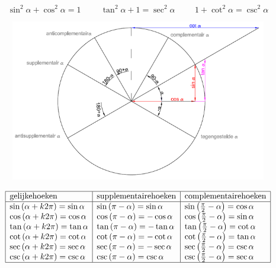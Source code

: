 \documentclass[a5paper]{article}
\begin{document}
\[
\boxed{\sin^2{\alpha} + \cos^2{\alpha} = 1} \hspace{1cm}
\boxed{\tan^2{\alpha} + 1 = \sec^2{\alpha}} \hspace{1cm}
\boxed{1 + \cot^2{\alpha} = \csc^2{\alpha}}
\]

\newpage
\begin{figure}
    \centering
    \includegraphics[width=1\linewidth]{image_goniometrie_verwante_hoeken.png}
  
    \label{fig:enter-label}
\end{figure}

\[
\begin{array}{|l|l|l|}
\hline
\text{gelijkehoeken} & \text{supplementairehoeken} & \text{complementairehoeken} \\
\hline
\sin{\left(\alpha + k2\pi\right)} = \sin{\alpha} & \sin{\left(\pi - \alpha\right)} = \sin{\alpha} & \sin{\left(\frac{\pi}{2} - \alpha\right)} = \cos{\alpha} \\
\cos{\left(\alpha + k2\pi\right)} = \cos{\alpha} & \cos{\left(\pi - \alpha\right)} = -\cos{\alpha} & \cos{\left(\frac{\pi}{2} - \alpha\right)} = \sin{\alpha} \\
\tan{\left(\alpha + k2\pi\right)} = \tan{\alpha} & \tan{\left(\pi - \alpha\right)} = -\tan{\alpha} & \tan{\left(\frac{\pi}{2} - \alpha\right)} = \cot{\alpha} \\
\cot{\left(\alpha + k2\pi\right)} = \cot{\alpha} & \cot{\left(\pi - \alpha\right)} = -\cot{\alpha} & \cot{\left(\frac{\pi}{2} - \alpha\right)} = \tan{\alpha} \\
\sec{\left(\alpha + k2\pi\right)} = \sec{\alpha} & \sec{\left(\pi - \alpha\right)} = -\sec{\alpha} & \sec{\left(\frac{\pi}{2} - \alpha\right)} = \csc{\alpha} \\
\csc{\left(\alpha + k2\pi\right)} = \csc{\alpha} & \csc{\left(\pi - \alpha\right)} = \csc{\alpha} & \csc{\left(\frac{\pi}{2} - \alpha\right)} = \sec{\alpha} \\
\hline
\end{array}
\]
\end{document}
